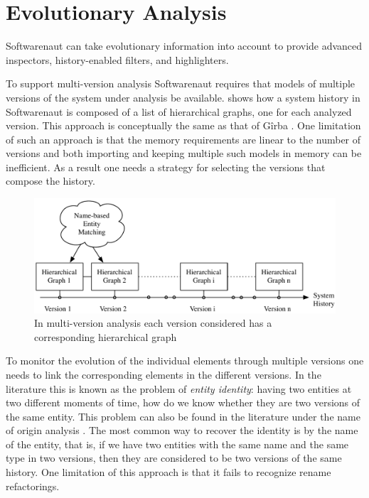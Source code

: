 \documentclass[preprint,12pt]{elsarticle}
\begin{document}
\section {Evolutionary Analysis} 

Softwarenaut can take evolutionary information into account to provide advanced inspectors, history-enabled filters, and highlighters.


To support multi-version analysis Softwarenaut requires that models of multiple versions of the system under analysis be available.  shows how a system history in Softwarenaut is composed of a list of hierarchical graphs, one for each analyzed version. This approach is conceptually the same as that of G{\^i}rba \cite{girba-thesis}. One limitation of such an approach is that the memory requirements are linear to the number of versions and both importing and keeping multiple such models in memory can be inefficient. As a result one needs a strategy for selecting the versions that compose the history.

\begin{figure}[ht]
\begin{center}
\includegraphics[width=0.9\linewidth]{MultiVersionAnalysis}
\caption{In multi-version analysis each version considered has a corresponding hierarchical graph}
\end{center}
\end{figure}


To monitor the evolution of the individual elements through multiple versions one needs to link the corresponding elements in the different versions. In the literature this is known as the problem of {\em entity identity}: having two entities at two different moments of time, how do we know whether they are two versions of the same entity. This problem can also be found in the literature under the name of origin analysis \cite{antoniol-discontinuities}. The most common way to recover the identity is by the name of the entity, that is, if we have two entities with the same name and the same type in two versions, then they are considered to be two versions of the same history. One limitation of this approach is that it fails to recognize rename refactorings. 
\end{document}
